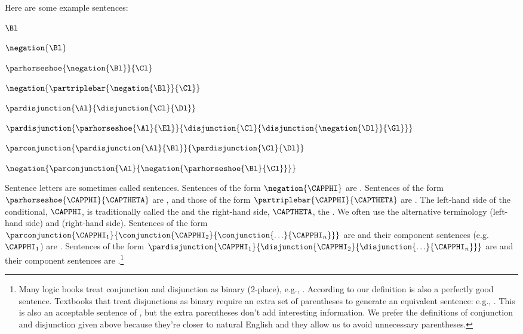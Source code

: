 \noindent{}Here are some example \GSL{} sentences:
	
\begin{multicols}{2}
	\begin{smenumerate}
	\item $\Bl$
	\item $\negation{\Bl}$
	\item $\parhorseshoe{\negation{\Bl}}{\Cl}$
	\item $\negation{\partriplebar{\negation{\Bl}}{\Cl}}$
	\item $\pardisjunction{\Al}{\disjunction{\Cl}{\Dl}}$
	\item $\pardisjunction{\parhorseshoe{\Al}{\El}}{\disjunction{\Cl}{\disjunction{\negation{\Dl}}{\Gl}}}$
	\item $\parconjunction{\pardisjunction{\Al}{\Bl}}{\pardisjunction{\Cl}{\Dl}}$
	\item $\negation{\parconjunction{\Al}{\negation{\parhorseshoe{\Bl}{\Cl}}}}$
	\end{smenumerate}
\end{multicols}

Sentence letters are sometimes called  sentences.
Sentences of the form $\negation{\CAPPHI}$ are .
Sentences of the form $\parhorseshoe{\CAPPHI}{\CAPTHETA}$ are , and those of the form $\partriplebar{\CAPPHI}{\CAPTHETA}$ are . 
The left-hand side of the conditional, $\CAPPHI$, is traditionally called the  and the right-hand side, $\CAPTHETA$, the . 
We often use the alternative terminology  (left-hand side) and  (right-hand side).
Sentences of the form $\parconjunction{\CAPPHI_1}{\conjunction{\CAPPHI_2}{\conjunction{\ldots}{\CAPPHI_{\integer{n}}}}}$ are  and their component sentences (e.g. $\CAPPHI_1$) are .
Sentences of the form $\pardisjunction{\CAPPHI_1}{\disjunction{\CAPPHI_2}{\disjunction{\ldots}{\CAPPHI_{\integer{n}}}}}$ are  and their component sentences are .\footnote{
	Many logic books treat conjunction and disjunction as binary (2-place), e.g., \mention{$\pardisjunction{\Al}{\Bl}$}. According to our definition \mention{$\pardisjunction{\disjunction{\Al}{\Bl}}{\Cl}$} is also a perfectly good sentence. Textbooks that treat disjunctions as binary require an extra set of parentheses to generate an equivalent sentence: e.g., \mention{$\pardisjunction{\pardisjunction{\Al}{\Bl}}{\Cl}$}. This is also an acceptable sentence of \GSL{}, but the extra parentheses don't add interesting information. We prefer the definitions of conjunction and disjunction given above because they're closer to natural English and they allow us to avoid unnecessary parentheses.
}

